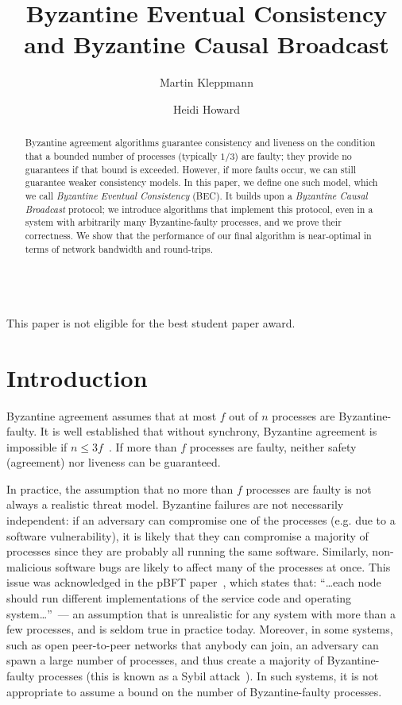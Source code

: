 \documentclass[a4paper,anonymous,USenglish]{lipics-v2019}
\title{Byzantine Eventual Consistency and Byzantine Causal Broadcast}
\author{Martin Kleppmann}{University of Cambridge}{mk428@cst.cam.ac.uk}{https://orcid.org/0000-0001-7252-6958}{Supported by a Leverhulme Trust Early Career Fellowship and by the Isaac Newton Trust.}
\author{Heidi Howard}{University of Cambridge}{hh360@cst.cam.ac.uk}{https://orcid.org/0000-0001-5256-7664}{}
\begin{document}
\maketitle
\begin{abstract}
    Byzantine agreement algorithms guarantee consistency and liveness on the condition that a bounded number of processes (typically $1/3$) are faulty; they provide no guarantees if that bound is exceeded.
    However, if more faults occur, we can still guarantee weaker consistency models. 
    In this paper, we define one such model, which we call \emph{Byzantine Eventual Consistency} (BEC).
    It builds upon a \emph{Byzantine Causal Broadcast} protocol; we introduce algorithms that implement this protocol, even in a system with arbitrarily many Byzantine-faulty processes, and we prove their correctness.
    We show that the performance of our final algorithm is near-optimal in terms of network bandwidth and round-trips.
\end{abstract}
\maketitle\\[20pt]
This paper is not eligible for the best student paper award.
\newpage

\section{Introduction}

Byzantine agreement assumes that at most $f$ out of $n$ processes are Byzantine-faulty.
It is well established that without synchrony, Byzantine agreement is impossible if $n\leq3f$~\cite{Dwork:1988,Lamport:1982}.
If more than $f$ processes are faulty, neither safety (agreement) nor liveness can be guaranteed.

In practice, the assumption that no more than $f$ processes are faulty is not always a realistic threat model.
Byzantine failures are not necessarily independent: if an adversary can compromise one of the processes (e.g. due to a software vulnerability), it is likely that they can compromise a majority of processes since they are probably all running the same software. 
Similarly, non-malicious software bugs are likely to affect many of the processes at once.
This issue was acknowledged in the pBFT paper~\cite{Castro:1999}, which states that: ``{\dots}each node should run different implementations of the service code and operating system{\dots}''~--- an assumption that is unrealistic for any system with more than a few processes, and is seldom true in practice today.
Moreover, in some systems, such as open peer-to-peer networks that anybody can join, an adversary can spawn a large number of processes, and thus create a majority of Byzantine-faulty processes (this is known as a Sybil attack~\cite{Douceur:2002}).
In such systems, it is not appropriate to assume a bound on the number of Byzantine-faulty processes.
\end{document}

